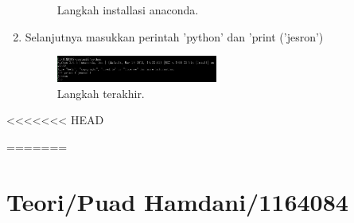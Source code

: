 \begin{enumerate}
\begin{figure}[ht]
\caption{Langkah installasi anaconda.}
\end{figure}
\item  Selanjutnya masukkan perintah 'python' dan 'print ('jesron')
\begin{figure}[ht]
\centerline{\includegraphics[width=0.5\textwidth]{figures/4.JPEG}}
\caption{Langkah terakhir.}
\end{figure}
\end{enumerate}

<<<<<<< HEAD


=======
\section{Teori/Puad Hamdani/1164084}
